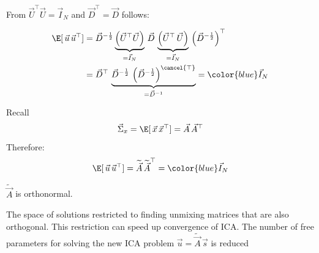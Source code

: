 \begin{frame}


From $\vec U^\top\vec U = \vec I_N$ and $\vec D^\top = \vec D$ follows:

\begin{align}
\E \lbrack\, \vec u \, \vec u^\top \rbrack
&=
\vec D^{-\frac{1}{2}}
\underbrace{\left( \vec U^\top  \vec U \right)}_{= \vec I_N}
\, \vec D \, 
\underbrace{\left( \vec U^\top \,  \vec U \right)}_{= \vec I_N}
\,
\left(\vec D^{-\frac{1}{2}} \right)^\top \\
&= \vec D^{\top}
\, 
\underbrace{\vec D^{-\frac{1}{2}}  \, 
\left(\vec D^{-\frac{1}{2}} \right)^{\cancel{\top}}}_{=\vec D^{-1}} = {\color{blue}\vec I_N}
\end{align}


Recall 
\begin{equation}
\vec \Sigma_x =  \E \lbrack \, \vec x \, \vec x^\top \rbrack
=  \vec A\, \vec A^\top
\end{equation}
Therefore:
\begin{equation}
\E \lbrack \, \vec u \, \vec u^\top \rbrack
= \widetilde {\vec A}\, \widetilde {\vec A}^\top = {\color{blue}\vec I_N}
\end{equation}

$\widetilde{\vec A}$ is orthonormal.\\

\end{frame}

\begin{frame}{\subsecname}


\pause

\svspace{5mm}

The space of solutions restricted to finding unmixing matrices that are also orthogonal.
This restriction can speed up convergence of ICA. 
The number of free parameters for solving the new ICA problem 
$\vec u = \widetilde{\vec A}\, \vec s$
is reduced

\end{frame}

